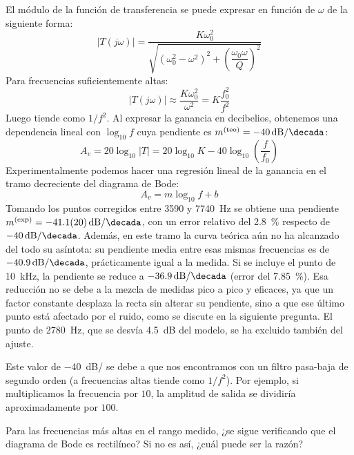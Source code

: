 \documentclass[a4paper,11pt]{article}
\begin{document}
El módulo de la función de transferencia se puede expresar en función de $\omega$ de la siguiente forma:
\begin{equation}
    |T(j\omega)|=\frac{K\omega_0^2}{\sqrt{(\omega_0^2-\omega^2)^2+\left(\dfrac{\omega_0\omega}{Q}\right)^2}}
\end{equation}
Para frecuencias suficientemente altas:
\begin{equation}
    |T(j\omega)|\approx \frac{K\omega_0^2}{\omega^2}=K\frac{f_0^2}{f^2}
\end{equation}
Luego tiende como $1/f^2$. Al expresar la ganancia en decibelios, obtenemos una dependencia lineal con $\log_{10}f$ cuya pendiente es $m^{(\text{teo})} = \qty{-40}{dB/\decada}$:
\begin{equation}
A_v = 20\log_{10}|T| = 20\log_{10}K-40\log_{10}\left(\frac{f}{f_0}\right)
\end{equation}
Experimentalmente podemos hacer una regresión lineal de la ganancia en el tramo decreciente del diagrama de Bode:
\begin{equation}
    A_v = m\log_{10}f+b
\end{equation}
Tomando los puntos corregidos entre \qty{3590}{} y \qty{7740}{Hz} se obtiene una pendiente $m^{(\text{exp})}=\qty{-41.1(20)}{dB/\decada}$, con un error relativo del \qty{2.8}{\percent} respecto de $\qty{-40}{dB/\decada}$. Además, en este tramo la curva teórica aún no ha alcanzado del todo su asíntota: su pendiente media entre esas mismas frecuencias es de $\qty{-40.9}{dB/\decada}$, prácticamente igual a la medida. Si se incluye el punto de \qty{10}{kHz}, la pendiente se reduce a $\qty{-36.9}{dB/\decada}$ (error del \qty{7.85}{\percent}). Esa reducción no se debe a la mezcla de medidas pico a pico y eficaces, ya que un factor constante desplaza la recta sin alterar su pendiente, sino a que ese último punto está afectado por el ruido, como se discute en la siguiente pregunta. El punto de \qty{2780}{Hz}, que se desvía \qty{4.5}{dB} del modelo, se ha excluido también del ajuste.

Este valor de \qty{-40}{dB/\decada} se debe a que nos encontramos con un filtro pasa-baja de segundo orden (a frecuencias altas tiende como $1/f^2$). Por ejemplo, si multiplicamos la frecuencia por $10$, la amplitud de salida se dividiría aproximadamente por $100$.

\begin{pregunta}
Para las frecuencias más altas en el rango medido, ¿se sigue verificando que el diagrama de Bode es rectilíneo? Si no es así, ¿cuál puede ser la razón?
\end{pregunta}
\end{document}
